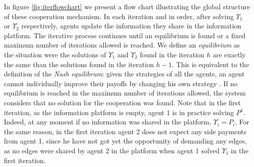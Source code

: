 \documentclass{article}
\begin{document}
In figure \ref{fig:iterflowchart} we present a flow chart illustrating the global structure of these cooperation mechanism.
In each iteration and in order, after solving $\Upsilon_1$ or $\Upsilon_2$ respectively, agents update the information they share in the information platform. The iterative process continues until an equilibrium is found or a fixed maximum number of iterations allowed is reached. We define an \emph{equilibrium} as the situation were the solutions of $\Upsilon_1$ and $\Upsilon_2$ found in the iteration $h$ are exactly the same than the solutions found in the iteration $h-1$. This is equivalent to the definition of the \emph{Nash equilibrum}: given the strategies of all the agents, an agent cannot individually improve their payoffs by changing his own strategy \parencite{GONZALEZ2010}. If no equilibrium is reached in the maximum number of iterations allowed, the system considers that no solution for the cooperation was found. Note that in the first iteration, as the information platform is empty, agent 1 is in practice solving $P^1$. Indeed, at any moment if no information was shared in the platform, $\Upsilon_i=P_i$. For the same reason, in the first iteration agent 2 does not expect any side payments from agent 1, since he have not got yet the opportunity of demanding any edges, as no edges were shared by agent 2 in the platform when agent 1 solved $\Upsilon_1$ in the first iteration. 
\end{document}

